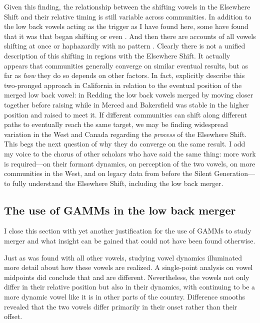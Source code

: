 Given this finding, the relationship between the shifting vowels in the Elsewhere Shift and their relative timing is still variable across communities. In addition to the low back vowels acting as the trigger as I have found here, some have found that it was \bat that began shifting \citep{kennedy_grama_2012, becker_etal_2016_pads} or even \dress \citep{holland_2014_diss}. And then there are accounts of all vowels shifting at once \citep{boberg_2005, lawrance_2002_thesis, donofrio_etal_2019} or haphazardly with no pattern \citep{pratt_etal_2018}. Clearly there is not a unified description of this shifting in regions with the Elsewhere Shift. It actually appears that communities generally converge on similar eventual results, but as far as \textit{how} they do so depends on other factors. In fact, \citet[23--25]{donofrio_etal_2017_pads} explicitly describe this two-pronged approach in California in relation to the eventual position of the merged low back vowel: in Redding the low back vowels merged by moving closer together before raising while in Merced and Bakersfield \thought was stable in the higher position and \lot raised to meet it. If different communities can shift along different paths to eventually reach the same target, we may be finding widespread variation in the West and Canada regarding the \textit{process} of the Elsewhere Shift. This begs the next question of why they do converge on the same result. I add my voice to the chorus of other scholars who have said the same thing: more work is required---on their formant dynamics, on perception of the two vowels, on more communities in the West, and on legacy data from before the Silent Generation---to fully understand the Elsewhere Shift, including the low back merger.

\subsection{The use of GAMMs in the low back merger}

I close this section with yet another justification for the use of GAMMs to study merger and what insight can be gained that could not have been found otherwise.

Just as was found with all other vowels, studying vowel dynamics illuminated more detail about how these vowels are realized. A single-point analysis on vowel midpoints did conclude that \lot and \thought are different. Nevertheless, the vowels not only differ in their relative position but also in their dynamics, with \thought continuing to be a more dynamic vowel like it is in other parts of the country. Difference smooths revealed that the two vowels differ primarily in their onset rather than their offset.

